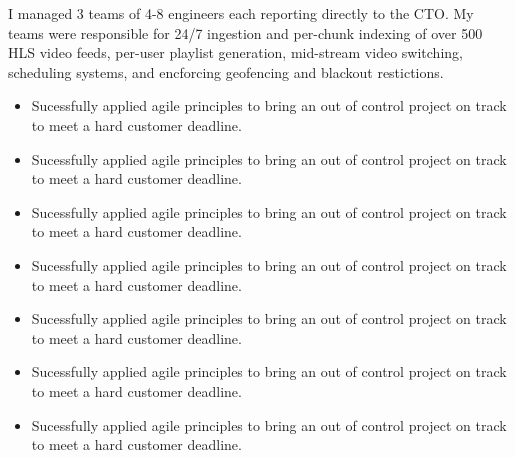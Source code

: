 \documentclass[12t]{article}
\begin{document}
\vspace{3pt} I managed 3 teams of 4-8 engineers each reporting directly to the CTO. My teams were responsible for 24/7 ingestion and per-chunk indexing of
over 500 HLS video feeds, per-user playlist generation, mid-stream video switching, scheduling systems, and encforcing geofencing and blackout restictions. 

\begin{multicols}{2}
  \begin{small}
    \begin{itemize}[leftmargin=*,label=\tiny{$\bullet$}]
    \item\begin{minipage}[t]{\linewidth}{Sucessfully applied agile principles to bring an out of control project on track to meet a hard customer deadline.}\end{minipage}
    \item\begin{minipage}[t]{\linewidth}{Sucessfully applied agile principles to bring an out of control project on track to meet a hard customer deadline.}\end{minipage}
    \item\begin{minipage}[t]{\linewidth}{Sucessfully applied agile principles to bring an out of control project on track to meet a hard customer deadline.}\end{minipage}
    \item\begin{minipage}[t]{\linewidth}{Sucessfully applied agile principles to bring an out of control project on track to meet a hard customer deadline.}\end{minipage}
    \item\begin{minipage}[t]{\linewidth}{Sucessfully applied agile principles to bring an out of control project on track to meet a hard customer deadline.}\end{minipage}
    \item\begin{minipage}[t]{\linewidth}{Sucessfully applied agile principles to bring an out of control project on track to meet a hard customer deadline.}\end{minipage}
    \item\begin{minipage}[t]{\linewidth}{Sucessfully applied agile principles to bring an out of control project on track to meet a hard customer deadline.}\end{minipage}

\end{itemize}
\end{small}
\end{multicols}
\end{document}
